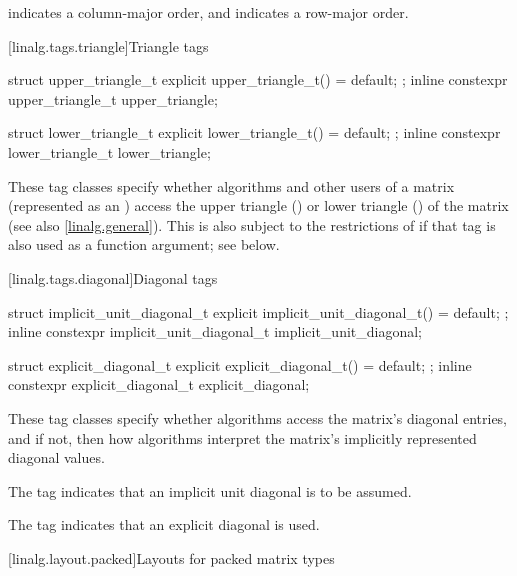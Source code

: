 \begin{itemdescr}
\pnum
{} indicates a column-major order,
and  indicates a row-major order.
\end{itemdescr}

[linalg.tags.triangle]{Triangle tags}

\begin{itemdecl}
struct upper_triangle_t {
  explicit upper_triangle_t() = default;
};
inline constexpr upper_triangle_t upper_triangle{};

struct lower_triangle_t {
  explicit lower_triangle_t() = default;
};
inline constexpr lower_triangle_t lower_triangle{};
\end{itemdecl}

\begin{itemdescr}
\pnum
These tag classes specify whether
algorithms and other users of a matrix (represented as an )
access the
upper triangle () or
lower triangle ()
of the matrix (see also \ref{linalg.general}).
This is also subject to the restrictions of 
if that tag is also used as a function argument; see below.
\end{itemdescr}

[linalg.tags.diagonal]{Diagonal tags}

\begin{itemdecl}
struct implicit_unit_diagonal_t {
  explicit implicit_unit_diagonal_t() = default;
};
inline constexpr implicit_unit_diagonal_t
  implicit_unit_diagonal{};

struct explicit_diagonal_t {
  explicit explicit_diagonal_t() = default;
};
inline constexpr explicit_diagonal_t explicit_diagonal{};
\end{itemdecl}

\begin{itemdescr}
\pnum
These tag classes specify whether algorithms
access the matrix's diagonal entries, and if not,
then how algorithms interpret
the matrix's implicitly represented diagonal values.

\pnum
The  tag indicates that
an implicit unit diagonal is to be assumed.

\pnum
The  tag indicates that
an explicit diagonal is used.
\end{itemdescr}

[linalg.layout.packed]{Layouts for packed matrix types}

